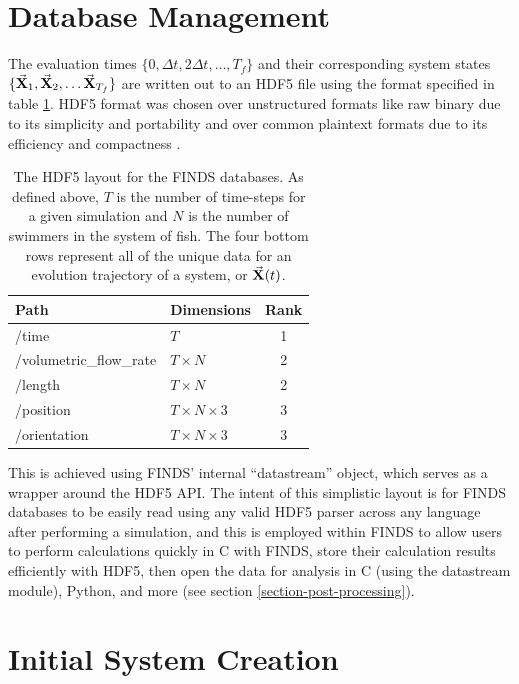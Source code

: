 \documentclass[letterpaper, 10pt, twoside]{LTJournalArticle}
\begin{document}
\section{Database Management}
\label{section-database-management}

The evaluation times $\{0, \Delta t, 2 \Delta t, \dots, T_f \}$ and their
corresponding system states $\{ \va{X}_1, \va{X}_2, \dots \va{X}_{T_f} \}$
are written out to an HDF5 file using the format specified in table
\ref{tbl-hdf5-database}. HDF5 format was chosen over unstructured formats like
raw binary due to its simplicity and portability and over common plaintext
formats due to its efficiency and compactness \cite{hdf5_2025}.

\begin{table}[htbp]
\centering
\begin{tabular}{llc}
\textbf{Path}           & \textbf{Dimensions}   & \textbf{Rank} \\ \hline
/time                   & $T$                   & 1             \\
/volumetric\_flow\_rate & $T \times N$          & 2             \\
/length                 & $T \times N$          & 2             \\
/position               & $T \times N \times 3$ & 3             \\
/orientation            & $T \times N \times 3$ & 3
\end{tabular}
\caption{The HDF5 layout for the FINDS databases. As defined above, $T$ is the
  number of time-steps for a given simulation and $N$ is the number of swimmers
  in the system of fish. The four bottom rows represent all of the unique data
  for an evolution trajectory of a system, or $\va{X}(t)$.
}
\label{tbl-hdf5-database}
\end{table}

This is achieved using FINDS' internal ``datastream'' object, which serves as
a wrapper around the HDF5 API. The intent of this simplistic layout is for FINDS
databases to be easily read using any valid HDF5 parser across any language
after performing a simulation, and this is employed within FINDS to allow users
to perform calculations quickly in C with FINDS, store their calculation
results efficiently with HDF5, then open the data for analysis in C (using the
datastream module), Python, and more (see section
\ref{section-post-processing}).

\section{Initial System Creation}
\label{section-initial-system-creation}
\end{document}
